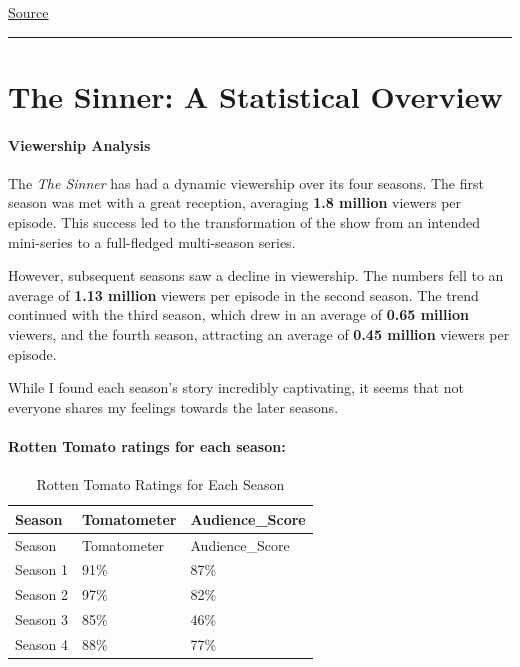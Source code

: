\documentclass[
  letterpaper,
  DIV=11,
  numbers=noendperiod]{scrartcl}
\let\oldparagraph\paragraph
\renewcommand{\paragraph}[1]{\oldparagraph{#1}\mbox{}}
\begin{document}
\href{https://www.theguardian.com/tv-and-radio/2017/nov/09/the-sinner-review-the-psychological-whydunnit-thats-been-a-big-us-ratings-success}{Source}

\begin{center}\rule{0.5\linewidth}{0.5pt}\end{center}

\hypertarget{the-sinner-a-statistical-overview}{%
\section{The Sinner: A Statistical
Overview}\label{the-sinner-a-statistical-overview}}

\paragraph{Viewership Analysis}

The \emph{The Sinner} has had a dynamic viewership over its four
seasons. The first season was met with a great reception, averaging
\textbf{1.8 million} viewers per episode. This success led to the
transformation of the show from an intended mini-series to a
full-fledged multi-season series.

However, subsequent seasons saw a decline in viewership. The numbers
fell to an average of \textbf{1.13 million} viewers per episode in the
second season. The trend continued with the third season, which drew in
an average of \textbf{0.65 million} viewers, and the fourth season,
attracting an average of \textbf{0.45 million} viewers per episode.

While I found each season's story incredibly captivating, it seems that
not everyone shares my feelings towards the later seasons.

\paragraph{Rotten Tomato ratings for each season:}

\begin{longtable}[]{@{}lll@{}}
\caption{Rotten Tomato Ratings for Each Season}\tabularnewline
\toprule\noalign{}
Season & Tomatometer & Audience\_Score \\
\midrule\noalign{}
\endfirsthead
\toprule\noalign{}
Season & Tomatometer & Audience\_Score \\
\midrule\noalign{}
\endhead
\bottomrule\noalign{}
\endlastfoot
Season 1 & 91\% & 87\% \\
Season 2 & 97\% & 82\% \\
Season 3 & 85\% & 46\% \\
Season 4 & 88\% & 77\% \\
\end{longtable}
\end{document}
